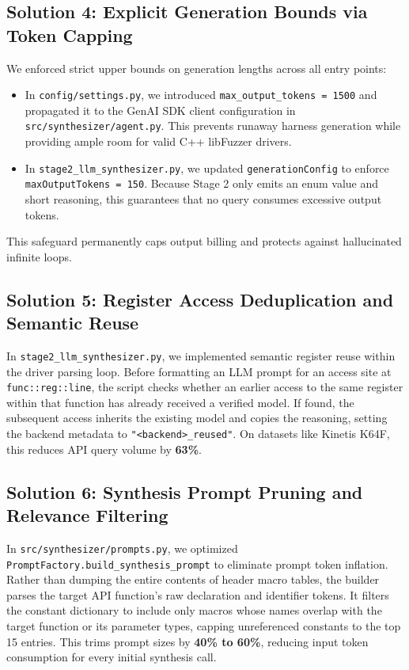 \documentclass[11pt,a4paper]{article}
\begin{document}
\subsection{Solution 4: Explicit Generation Bounds via Token Capping}
We enforced strict upper bounds on generation lengths across all entry points:
\begin{itemize}[leftmargin=1.8em, itemsep=0.2em]
    \item In \texttt{config/settings.py}, we introduced \texttt{max\_output\_tokens = 1500} and propagated it to the GenAI SDK client configuration in \texttt{src/synthesizer/agent.py}. This prevents runaway harness generation while providing ample room for valid C++ libFuzzer drivers.
    \item In \texttt{stage2\_llm\_synthesizer.py}, we updated \texttt{generationConfig} to enforce \texttt{maxOutputTokens = 150}. Because Stage 2 only emits an enum value and short reasoning, this guarantees that no query consumes excessive output tokens.
\end{itemize}
This safeguard permanently caps output billing and protects against hallucinated infinite loops.

\subsection{Solution 5: Register Access Deduplication and Semantic Reuse}
In \texttt{stage2\_llm\_synthesizer.py}, we implemented semantic register reuse within the driver parsing loop. Before formatting an LLM prompt for an access site at \texttt{func::reg::line}, the script checks whether an earlier access to the same register within that function has already received a verified model. If found, the subsequent access inherits the existing model and copies the reasoning, setting the backend metadata to \texttt{"<backend>\_reused"}. On datasets like Kinetis K64F, this reduces API query volume by \textbf{63\%}.

\subsection{Solution 6: Synthesis Prompt Pruning and Relevance Filtering}
In \texttt{src/synthesizer/prompts.py}, we optimized \texttt{PromptFactory.build\_synthesis\_prompt} to eliminate prompt token inflation. Rather than dumping the entire contents of header macro tables, the builder parses the target API function's raw declaration and identifier tokens. It filters the constant dictionary to include only macros whose names overlap with the target function or its parameter types, capping unreferenced constants to the top 15 entries. This trims prompt sizes by \textbf{40\% to 60\%}, reducing input token consumption for every initial synthesis call.
\end{document}
